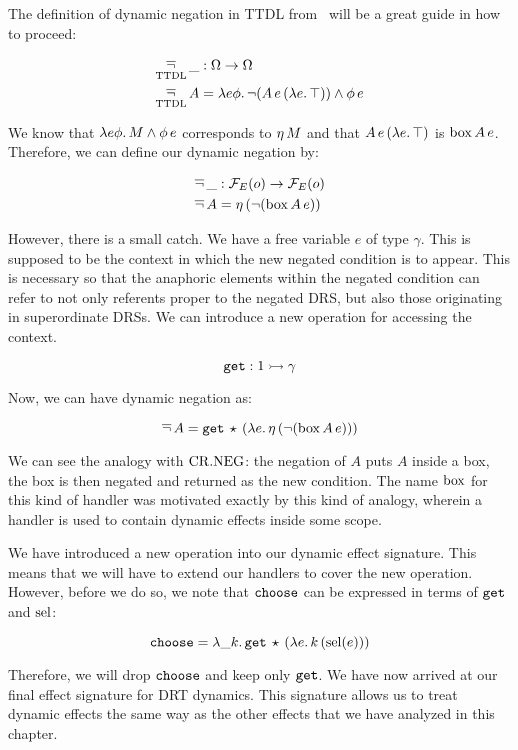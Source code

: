 The definition of dynamic negation in TTDL
from~\cite{lebedeva2012expression} will be a great guide in how to proceed:

\begin{align*}
\mathop{\overline{\lnot}}_{\operatorname{TTDL}} \_ &: \Omega \to \Omega \\
\mathop{\overline{\lnot}}_{\operatorname{TTDL}} A &= \lambda e \phi.\, \lnot (A\,e\,(\lambda e.\, \top)) \land \phi\,e
\end{align*}

We know that $\lambda e \phi.\, M \land \phi\,e$ corresponds to $\eta\,M$
and that $A\,e\,(\lambda e.\, \top)$ is $\mathrm{box}\,A\,e$. Therefore, we
can define our dynamic negation by:

\begin{align*}
\mathop{\overline{\lnot}} \_ &: \mathcal{F}_E(o) \to \mathcal{F}_E(o) \\
\mathop{\overline{\lnot}} A &= \eta\,(\lnot (\mathrm{box}\,A\,e))
\end{align*}

However, there is a small catch. We have a free variable $e$ of type
$\gamma$. This is supposed to be the context in which the new negated
condition is to appear. This is necessary so that the anaphoric elements
within the negated condition can refer to not only referents proper to the
negated DRS, but also those originating in superordinate DRSs. We can
introduce a new operation for accessing the context.

$$
\mathtt{get} : 1 \rightarrowtail \gamma
$$

Now, we can have dynamic negation as:

$$
\mathop{\overline{\lnot}} A = \mathtt{get}\,\star\,(\lambda e.\, \eta\,(\lnot (\mathrm{box}\,A\,e)))
$$

We can see the analogy with $\mathrm{CR.NEG}$: the negation of $A$ puts $A$ inside a
box, the box is then negated and returned as the new condition. The name
$\mathrm{box}$ for this kind of handler was motivated exactly by this kind of
analogy, wherein a handler is used to contain dynamic effects inside some
scope.

We have introduced a new operation into our dynamic effect signature. This
means that we will have to extend our handlers to cover the new
operation. However, before we do so, we note that $\mathtt{choose}$ can be
expressed in terms of $\mathtt{get}$ and $\operatorname{sel}$:

$$
\mathtt{choose} = \lambda \_ k.\, \mathtt{get}\,\star\,(\lambda e.\, k\,(\operatorname{sel}(e)))
$$

Therefore, we will drop $\mathtt{choose}$ and keep only $\mathtt{get}$. We have now
arrived at our final effect signature for DRT dynamics. This signature
allows us to treat dynamic effects the same way as the other effects that
we have analyzed in this chapter.

